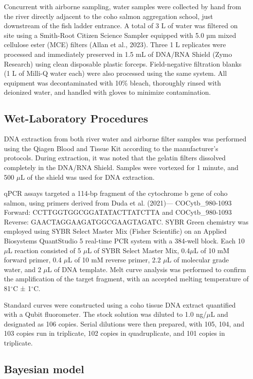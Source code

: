 \documentclass{article}
\begin{document}
Concurrent with airborne sampling, water samples were collected by hand from the river directly adjacent to the coho salmon aggregation school, just downstream of the fish ladder entrance. A total of 3 L of water was filtered on site using a Smith-Root Citizen Science Sampler equipped with 5.0 µm mixed cellulose ester (MCE) filters (Allan et al., 2023). Three 1 L replicates were processed and immediately preserved in 1.5 mL of DNA/RNA Shield (Zymo Research) using clean disposable plastic forceps. Field-negative filtration blanks (1 L of Milli-Q water each) were also processed using the same system. All equipment was decontaminated with 10\% bleach, thoroughly rinsed with deionized water, and handled with gloves to minimize contamination.


\subsection{Wet-Laboratory Procedures}
DNA extraction from both river water and airborne filter samples was performed using the Qiagen Blood and Tissue Kit according to the manufacturer’s protocols. During extraction, it was noted that the gelatin filters dissolved completely in the DNA/RNA Shield. Samples were vortexed for 1 minute, and 500 $\mu$L of the shield was used for DNA extraction.

qPCR assays targeted a 114-bp fragment of the cytochrome b gene of coho salmon, using primers derived from Duda et al. (2021)— COCytb\_980-1093 Forward: CCTTGGTGGCGGATATACTTATCTTA and COCytb\_980-1093 Reverse: GAACTAGGAAGATGGCGAAGTAGATC. SYBR Green chemistry was employed using SYBR Select Master Mix (Fisher Scientific) on an Applied Biosystems QuantStudio 5 real-time PCR system with a 384-well block. Each 10 $\mu$L reaction consisted of 5 $\mu$L of SYBR Select Master Mix, 0.4$\mu$L of 10 mM forward primer, 0.4 $\mu$L of 10 mM reverse primer, 2.2 $\mu$L of molecular grade water, and 2 $\mu$L of DNA template. Melt curve analysis was performed to confirm the amplification of the target fragment, with an accepted melting temperature of 81$^\circ$C ± 1$^\circ$C.

Standard curves were constructed using a coho tissue DNA extract quantified with a Qubit fluorometer. The stock solution was diluted to 1.0 ng/$\mu$L and designated as 106 copies. Serial dilutions were then prepared, with 105, 104, and 103 copies run in triplicate, 102 copies in quadruplicate, and 101 copies in triplicate.


\subsection{Bayesian model}
\end{document}
